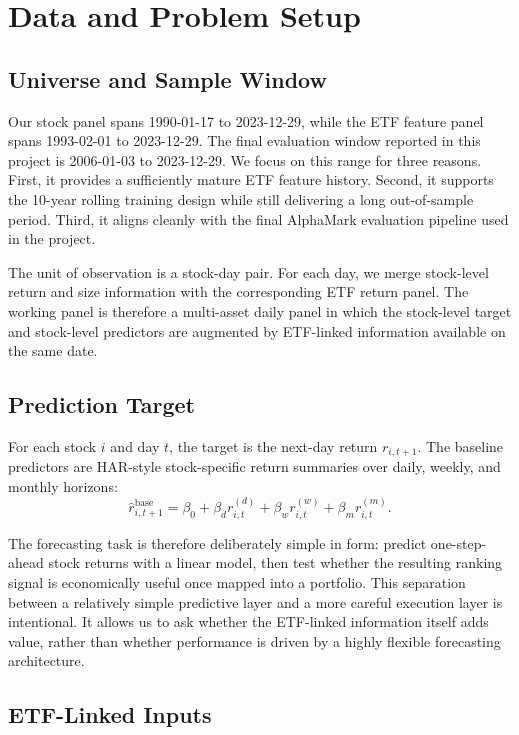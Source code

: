 \section{Data and Problem Setup}
\label{sec:data}

\subsection{Universe and Sample Window}

Our stock panel spans 1990-01-17 to 2023-12-29, while the ETF feature panel spans 1993-02-01 to 2023-12-29. The final evaluation window reported in this project is 2006-01-03 to 2023-12-29. We focus on this range for three reasons. First, it provides a sufficiently mature ETF feature history. Second, it supports the 10-year rolling training design while still delivering a long out-of-sample period. Third, it aligns cleanly with the final AlphaMark evaluation pipeline used in the project.

The unit of observation is a stock-day pair. For each day, we merge stock-level return and size information with the corresponding ETF return panel. The working panel is therefore a multi-asset daily panel in which the stock-level target and stock-level predictors are augmented by ETF-linked information available on the same date.

\subsection{Prediction Target}

For each stock $i$ and day $t$, the target is the next-day return $r_{i,t+1}$. The baseline predictors are HAR-style stock-specific return summaries over daily, weekly, and monthly horizons:
\[
\hat r^{\mathrm{base}}_{i,t+1}
=
\beta_0
+ \beta_d r^{(d)}_{i,t}
+ \beta_w r^{(w)}_{i,t}
+ \beta_m r^{(m)}_{i,t}.
\]

The forecasting task is therefore deliberately simple in form: predict one-step-ahead stock returns with a linear model, then test whether the resulting ranking signal is economically useful once mapped into a portfolio. This separation between a relatively simple predictive layer and a more careful execution layer is intentional. It allows us to ask whether the ETF-linked information itself adds value, rather than whether performance is driven by a highly flexible forecasting architecture.

\subsection{ETF-Linked Inputs}

